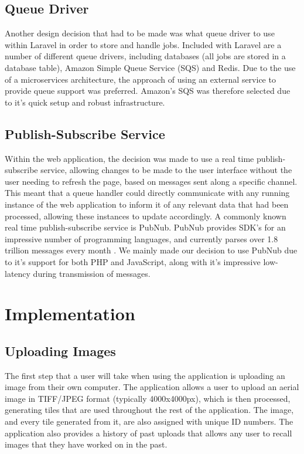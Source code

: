 \subsection{Queue Driver}

Another design decision that had to be made was what queue driver to use within Laravel in order to store and handle jobs. Included with Laravel are a number of different queue drivers, including databases (all jobs are stored in a database table), Amazon Simple Queue Service (SQS) and Redis. Due to the use of a microservices architecture, the approach of using an external service to provide queue support was preferred. Amazon’s SQS was therefore selected due to it’s quick setup and robust infrastructure.

\subsection{Publish-Subscribe Service}

Within the web application, the decision was made to use a real time publish-subscribe service, allowing changes to be made to the user interface without the user needing to refresh the page, based on messages sent along a specific channel. This meant that a queue handler could directly communicate with any running instance of the web application to inform it of any relevant data that had been processed, allowing these instances to update accordingly. A commonly known real time publish-subscribe service is PubNub. PubNub provides SDK’s for an impressive number of programming languages, and currently parses over 1.8 trillion messages every month \citep{pubnub_2016}. We mainly made our decision to use PubNub due to it’s support for both PHP and JavaScript, along with it’s impressive low-latency during transmission of messages.

\section{Implementation}

\subsection{Uploading Images}

The first step that a user will take when using the application is uploading an image from their own computer. The application allows a user to upload an aerial image in TIFF/JPEG format (typically 4000x4000px), which is then processed, generating tiles that are used throughout the rest of the application. The image, and every tile generated from it, are also assigned with unique ID numbers. The application also provides a history of past uploads that allows any user to recall images that they have worked on in the past.

